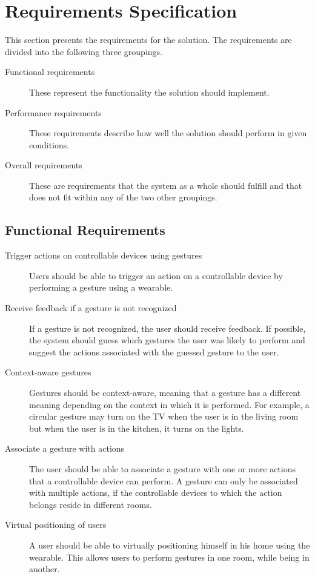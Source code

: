 \section{Requirements Specification}
\label{sec:requirements-specification}

This section presents the requirements for the solution. The requirements are divided into the following three groupings.

\begin{description}
\item[Functional requirements] These represent the functionality the solution should implement.
\item[Performance requirements] These requirements describe how well the solution should perform in given conditions.
\item[Overall requirements] These are requirements that the system as a whole should fulfill and that does not fit within any of the two other groupings.
\end{description}

\subsection{Functional Requirements}

\begin{description}
\item[Trigger actions on controllable devices using gestures] Users should be able to trigger an action on a controllable device by performing a gesture using a wearable.
\item[Receive feedback if a gesture is not recognized] If a gesture is not recognized, the user should receive feedback. If possible, the system should guess which gestures the user was likely to perform and suggest the actions associated with the guessed gesture to the user.
\item[Context-aware gestures] Gestures should be context-aware, meaning that a gesture has a different meaning depending on the context in which it is performed. For example, a circular gesture may turn on the TV when the user is in the living room but when the user is in the kitchen, it turns on the lights.
\item[Associate a gesture with actions] The user should be able to associate a gesture with one or more actions that a controllable device can perform. A gesture can only be associated with multiple actions, if the controllable devices to which the action belongs reside in different rooms.
\item[Virtual positioning of users] A user should be able to virtually positioning himself in his home using the wearable. This allows users to perform gestures in one room, while being in another.
\end{description}

